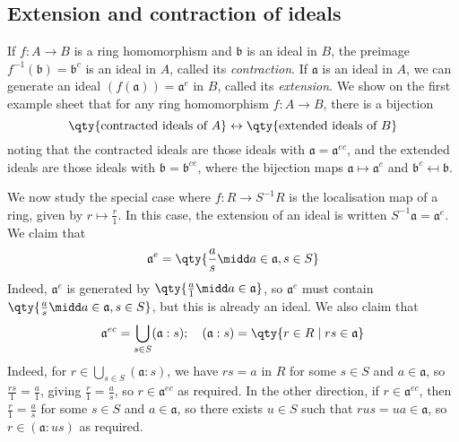 \subsection{Extension and contraction of ideals}
If \( f : A \to B \) is a ring homomorphism and \( \mathfrak b \) is an ideal in \( B \), the preimage \( f^{-1}(\mathfrak b) = \mathfrak b^c \) is an ideal in \( A \), called its \emph{contraction}.
If \( \mathfrak a \) is an ideal in \( A \), we can generate an ideal \( (f(\mathfrak a)) = \mathfrak a^e \) in \( B \), called its \emph{extension}.
We show on the first example sheet that for any ring homomorphism \( f : A \to B \), there is a bijection
\[ \qty{\text{contracted ideals of } A} \leftrightarrow \qty{\text{extended ideals of } B} \]
noting that the contracted ideals are those ideals with \( \mathfrak a = \mathfrak a^{ec} \), and the extended ideals are those ideals with \( \mathfrak b = \mathfrak b^{ce} \), where the bijection maps \( \mathfrak a \mapsto \mathfrak a^e \) and \( \mathfrak b^c \mapsfrom \mathfrak b \).

We now study the special case where \( f : R \to S^{-1}R \) is the localisation map of a ring, given by \( r \mapsto \frac{r}{1} \).
In this case, the extension of an ideal is written \( S^{-1}\mathfrak a = \mathfrak a^e \).
We claim that
\[ \mathfrak a^e = \qty{\frac{a}{s} \midd a \in \mathfrak a, s \in S} \]
Indeed, \( \mathfrak a^e \) is generated by \( \qty{\frac{a}{1} \midd a \in \mathfrak a} \), so \( \mathfrak a^e \) must contain \( \qty{\frac{a}{s} \midd a \in \mathfrak a, s \in S} \), but this is already an ideal.
We also claim that
\[ \mathfrak a^{ec} = \bigcup_{s \in S} (\mathfrak a : s);\quad (\mathfrak a : s) = \qty{r \in R \mid rs \in \mathfrak a} \]
Indeed, for \( r \in \bigcup_{s \in S} (\mathfrak a : s) \), we have \( rs = a \) in \( R \) for some \( s \in S \) and \( a \in \mathfrak a \), so \( \frac{rs}{1} = \frac{a}{1} \), giving \( \frac{r}{1} = \frac{a}{s} \), so \( r \in \mathfrak a^{ec} \) as required.
In the other direction, if \( r \in \mathfrak a^{ec} \), then \( \frac{r}{1} = \frac{a}{s} \) for some \( s \in S \) and \( a \in \mathfrak a \), so there exists \( u \in S \) such that \( rus = ua \in \mathfrak a \), so \( r \in (\mathfrak a : us) \) as required.

